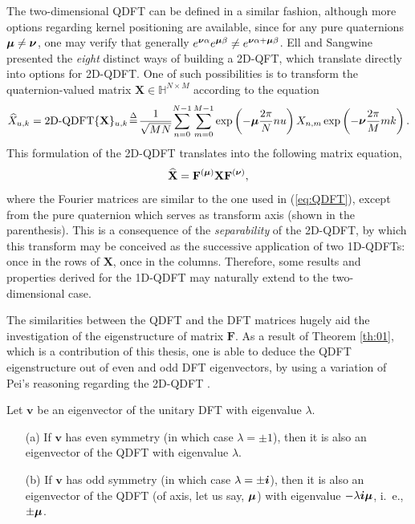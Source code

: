 The two-dimensional QDFT can be defined in a similar fashion, although more options regarding kernel positioning are available, since for any pure quaternions $ \boldsymbol{\mu} \neq \boldsymbol{\nu} $, one may verify that generally $ e^{\boldsymbol{\nu} \alpha} e^{\boldsymbol{\mu} \beta} \neq e^{\boldsymbol{\nu} \alpha + \boldsymbol{\mu} \beta} $. Ell and Sangwine \cite{ell2014quaternion} presented the \textit{eight} distinct ways of building a 2D-QFT, which translate directly into options for 2D-QDFT. One of such possibilities is to transform the quaternion-valued matrix $ \mathbf{X} \in \mathbb{H}^{N\times M}$ according to the equation
\begin{equation}
\label{eq:2DQDFT-01}
\widehat{X}_{u,k} = 
\text{2D-QDFT}\{ \mathbf{X} \}_{u,k} \!\overset{\Delta}{=}\! \frac{1}{\sqrt{MN}} \!\sum_{n=0}^{N-1} \sum_{m=0}^{M-1}  \exp \left( -\boldsymbol{\mu} \frac{2\pi}{N} nu \right) X_{n,m} \exp \left( -\boldsymbol{\nu} \frac{2\pi}{M} mk \right).
\end{equation}
This formulation of the 2D-QDFT translates into the following matrix equation,
\begin{equation}
\label{eq:2DQDFT-02}
\widehat{\mathbf{X}} = \mathbf{F}^{(\boldsymbol{\mu})} \mathbf{X} \mathbf{F}^{(\boldsymbol{\nu})},
\end{equation}
where the Fourier matrices are similar to the one used in (\ref{eq:QDFT}), except from the pure quaternion which serves as transform axis (shown in the parenthesis). This is a consequence of the \textit{separability} of the 2D-QDFT, by which this transform may be conceived as the successive application of two 1D-QDFTs: once in the rows of $ \mathbf{X} $, once in the columns. Therefore, some results and properties derived for the 1D-QDFT may naturally extend to the two-dimensional case.

The similarities between the QDFT and the DFT matrices hugely aid the investigation of the eigenstructure of matrix $ \mathbf{F} $. As a result of Theorem \ref{th:01}, which is a contribution of this thesis, one is able to deduce the QDFT eigenstructure out of even and odd DFT eigenvectors, by using a variation of Pei's reasoning regarding the 2D-QDFT \cite{pei2010eigenfunctions}.

\begin{theorem}
\label{th:01}
Let $ \mathbf{v} $ be an eigenvector of the unitary DFT with eigenvalue $ \lambda $.
\begin{itemize}[noitemsep]
\item[(a)] If $ \mathbf{v} $ has even symmetry (in which case $ \lambda = \pm 1 $), then it is also an eigenvector of the QDFT with eigenvalue $ \lambda $.
\item[(b)] If $ \mathbf{v} $ has odd symmetry (in which case $ \lambda = \pm \boldsymbol{i} $), then it is also an eigenvector of the QDFT (of axis, let us say, $ \boldsymbol{\mu} $) with eigenvalue $ -\lambda \boldsymbol{i} \boldsymbol{\mu}$, i.~e., $ \pm \boldsymbol{\mu} $.
\end{itemize}
\end{theorem}

